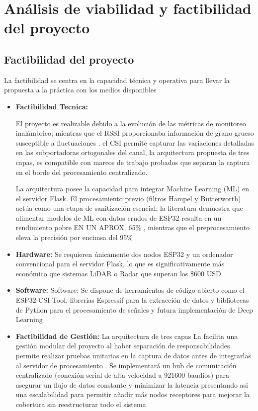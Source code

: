 \documentclass[12pt, a4paper]{article}
\begin{document}
\section{Análisis de viabilidad y factibilidad del proyecto}
\subsection{Factibilidad del proyecto}
La factibilidad se centra en la capacidad técnica y operativa para llevar la propuesta a la práctica con los medios disponibles

\begin{itemize}
\item \textbf{Factibilidad Tecnica:} 

El proyecto es realizable debido a la evolución de las métricas de monitoreo inalámbrico; mientras que el RSSI proporcionaba información de grano grueso susceptible a fluctuaciones\cite{chaudhari2026device} \cite{mosefi22}. el CSI permite capturar las variaciones detalladas en las subportadoras ortogonales del canal\cite{kong2025cirsenserethinkingwifisensing}, la arquitectura propuesta de tres capas, es compatible con marcos de trabajo probados que separan la captura en el borde del procesamiento centralizado\cite{kim2026csi}.

La arquitectura posee la capacidad para integrar Machine Learning (ML) en el servidor Flask. El procesamiento previo (filtros Hampel y Butterworth) actúa como una etapa de sanitización esencial; la literatura demuestra que alimentar modelos de ML con datos crudos de ESP32 resulta en un rendimiento pobre EN UN APROX. 65\% , mientras que el preprocesamiento eleva la precisión por encimsa del 95\% \cite{kim2026csi}\cite{geng2022denspose}\cite{wiesp}

\item \textbf{Hardware:} Se requieren únicamente dos nodos ESP32 y un ordenador convencional para el servidor Flask, lo que es significativamente más económico que sistemas LiDAR o Radar que superan los \$600 USD \cite{geng2022denspose}

\item \textbf{Software:} Software: Se dispone de herramientas de código abierto como el ESP32-CSI-Tool, librerias Espressif para la extracción de datos y bibliotecas de Python para el procesamiento de señales y futura implementación de Deep Learning \cite{tong2024human}

\item \textbf{Factibilidad de Gestión:}
La arquitectura de tres capas La facilita una gestión modular del proyecto al haber separación de responsabilidades permite realizar pruebas unitarias en la captura de datos antes de integrarlas al servidor de procesamiento \cite{kim2026csi}. Se implementará un hub de comunicación centralizado (conexión serial de alta velocidad a 921600 baudios) para asegurar un flujo de datos constante y minimizar la latencia \cite{tong2024human} presentando asi una escalabilidad para permitir  añadir más nodos receptores para mejorar la cobertura sin reestructurar todo el sistema
 \cite{kim2026csi}\cite{9900419}


\end{itemize}
\end{document}
